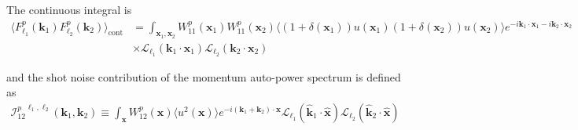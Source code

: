 \documentclass[a4paper,11pt]{article}
\begin{document}
The continuous integral is
\begin{align}
    \langle F^p_{\ell_1}(\boldsymbol{k}_1) F^p_{\ell_2}(\boldsymbol{k}_2) \rangle_{\mathrm{cont}}
    & =
    \int_{\boldsymbol{x}_1, \boldsymbol{x}_2} W^p_{11}(\boldsymbol{x}_1) W^p_{11}(\boldsymbol{x}_2) \langle (1+\delta(\boldsymbol{x}_1))u(\boldsymbol{x}_1) (1+\delta(\boldsymbol{x}_2))u(\boldsymbol{x}_2)\rangle
    e^{-i\boldsymbol{k}_1\cdot\boldsymbol{x}_1-i\boldsymbol{k}_2\cdot\boldsymbol{x}_2} \\
    & \times \mathcal{L}_{\ell_1}(\boldsymbol{k}_1\cdot\boldsymbol{x}_1) \mathcal{L}_{\ell_2}(\boldsymbol{k}_2\cdot\boldsymbol{x}_2) \nonumber 
\end{align}

and the shot noise contribution of the momentum auto-power spectrum is defined as
\begin{align}
    {\mathcal{I}_{12}^p}^{\ell_1, \ell_2} (\boldsymbol{k}_1, \boldsymbol{k}_2)
    \equiv\int_{\boldsymbol{x}} W^p_{12}(\boldsymbol{x})\langle u^2(\boldsymbol{x})\rangle e^{-i(\boldsymbol{k}_1+\boldsymbol{k}_2)\cdot\boldsymbol{x}}
    \mathcal{L}_{\ell_1}(\hat{\boldsymbol{k}}_1\cdot\hat{\boldsymbol{x}}) \mathcal{L}_{\ell_2}(\hat{\boldsymbol{k}}_2\cdot\hat{\boldsymbol{x}})
\end{align}
\end{document}

